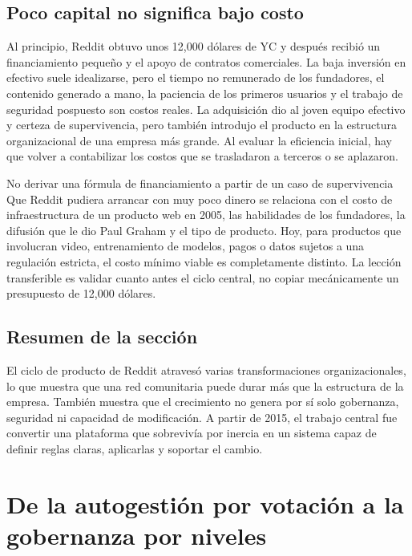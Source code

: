 \documentclass[a4paper]{article}
\begin{document}
\subsection{Poco capital no significa bajo costo}

Al principio, Reddit obtuvo unos 12,000 dólares de YC y después recibió un financiamiento pequeño y el apoyo de contratos comerciales. La baja inversión en efectivo suele idealizarse, pero el tiempo no remunerado de los fundadores, el contenido generado a mano, la paciencia de los primeros usuarios y el trabajo de seguridad pospuesto son costos reales. La adquisición dio al joven equipo efectivo y certeza de supervivencia, pero también introdujo el producto en la estructura organizacional de una empresa más grande. Al evaluar la eficiencia inicial, hay que volver a contabilizar los costos que se trasladaron a terceros o se aplazaron.

\begin{warningbox}{No derivar una fórmula de financiamiento a partir de un caso de supervivencia}
Que Reddit pudiera arrancar con muy poco dinero se relaciona con el costo de infraestructura de un producto web en 2005, las habilidades de los fundadores, la difusión que le dio Paul Graham y el tipo de producto. Hoy, para productos que involucran video, entrenamiento de modelos, pagos o datos sujetos a una regulación estricta, el costo mínimo viable es completamente distinto. La lección transferible es validar cuanto antes el ciclo central, no copiar mecánicamente un presupuesto de 12,000 dólares.
\end{warningbox}

\subsection{Resumen de la sección}

El ciclo de producto de Reddit atravesó varias transformaciones organizacionales, lo que muestra que una red comunitaria puede durar más que la estructura de la empresa. También muestra que el crecimiento no genera por sí solo gobernanza, seguridad ni capacidad de modificación. A partir de 2015, el trabajo central fue convertir una plataforma que sobrevivía por inercia en un sistema capaz de definir reglas claras, aplicarlas y soportar el cambio.
\section{De la autogestión por votación a la gobernanza por niveles}
\end{document}
